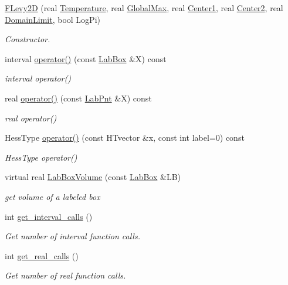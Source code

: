 \begin{DoxyCompactItemize}
\item 
\hyperlink{classFLevy2D_a5a66e2397fa91de9792552212a9d5cdc}{\-F\-Levy2\-D} (real \hyperlink{classFLevy2D_adfc81b0fad00fd255954e5f0a6ae786a}{\-Temperature}, real \hyperlink{classFLevy2D_ab9b008eeb65b79ca24dfd782a8d1541e}{\-Global\-Max}, real \hyperlink{classFLevy2D_a2ac016c1aefc1f4885817e5c96a35b5d}{\-Center1}, real \hyperlink{classFLevy2D_a40852278de546d74fa99913e5f107b51}{\-Center2}, real \hyperlink{LevyFobj2D_8cpp_ae28a2599911ae746bc33211d3ea52aaf}{\-Domain\-Limit}, bool \-Log\-Pi)
\begin{DoxyCompactList}\small\item\em \-Constructor. \end{DoxyCompactList}\item 
interval \hyperlink{classFLevy2D_a0bf7bf18b3f8bdcb2034526f2b809162}{operator()} (const \hyperlink{classLabBox}{\-Lab\-Box} \&\-X) const 
\begin{DoxyCompactList}\small\item\em interval operator() \end{DoxyCompactList}\item 
real \hyperlink{classFLevy2D_a69223536c13e52445d3ee1fc435447d8}{operator()} (const \hyperlink{classLabPnt}{\-Lab\-Pnt} \&\-X) const 
\begin{DoxyCompactList}\small\item\em real operator() \end{DoxyCompactList}\item 
\-Hess\-Type \hyperlink{classFLevy2D_a0a031a396ed8aa0591ee214a6ec20b7f}{operator()} (const \-H\-Tvector \&x, const int label=0) const 
\begin{DoxyCompactList}\small\item\em \-Hess\-Type operator() \end{DoxyCompactList}\item 
virtual real \hyperlink{classFLevy2D_a8d1acd389752d1554445b0247bb06f60}{\-Lab\-Box\-Volume} (const \hyperlink{classLabBox}{\-Lab\-Box} \&\-L\-B)
\begin{DoxyCompactList}\small\item\em get volume of a labeled box \end{DoxyCompactList}\item 
int \hyperlink{classFLevy2D_a8ca0edbf796cd3d7687a86a1c80266c1}{get\-\_\-interval\-\_\-calls} ()
\begin{DoxyCompactList}\small\item\em \-Get number of interval function calls. \end{DoxyCompactList}\item 
int \hyperlink{classFLevy2D_a48cec5994f9d62306e3852dda50f7f5a}{get\-\_\-real\-\_\-calls} ()
\begin{DoxyCompactList}\small\item\em \-Get number of real function calls. \end{DoxyCompactList}\end{DoxyCompactItemize}
